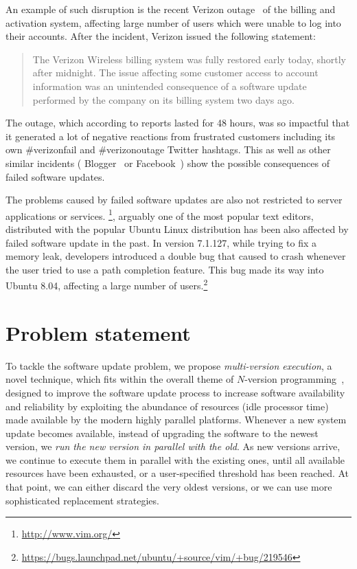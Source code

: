 An example of such disruption is the recent Verizon
outage~\cite{verizon-outage2014} of the billing and activation system,
affecting large number of users which were unable to log into their accounts.
After the incident, Verizon issued the following statement:
\begin{quotation}
The Verizon Wireless billing system was fully restored early today, shortly
after midnight. The issue affecting some customer access to account information
was an unintended consequence of a software update performed by the company on
its billing system two days ago.
\end{quotation}
The outage, which according to reports lasted for 48 hours, was so impactful
that it generated a lot of negative reactions from frustrated customers
including its own \textsf{\#verizonfail} and \textsf{\#verizonoutage} Twitter
hashtags.  This as well as other similar incidents (\eg
Blogger~\cite{blogger-incident2011} or Facebook~\cite{facebook-incident2010})
show the possible consequences of failed software updates.

The problems caused by failed software updates are also not restricted to
server applications or services. \vim\footnote{\url{http://www.vim.org/}},
arguably one of the most popular text editors, distributed with the popular
Ubuntu Linux distribution has been also affected by failed software update in
the past.  In version 7.1.127, while trying to fix a memory leak, \vim
developers introduced a double  bug that caused \vim to crash
whenever the user tried to use a path completion feature.  This bug made its
way into Ubuntu 8.04, affecting a large number of
users.\footnote{\url{https://bugs.launchpad.net/ubuntu/+source/vim/+bug/219546}}

\section{Problem statement}

To tackle the software update problem, we propose \emph{multi-version
execution}, a novel technique, which fits within the overall theme of
$N$-version programming~\cite{avizienis:nvp,chen1995}, designed to improve the
software update process to increase software availability and reliability by
exploiting the abundance of resources (\eg idle processor time) made available
by the modern highly parallel platforms.  Whenever a new system update becomes
available, instead of upgrading the software to the newest version, we
\emph{run the new version in parallel with the old}. As new versions arrive, we
continue to execute them in parallel with the existing ones, until all
available resources have been exhausted, or a user-specified threshold has been
reached.  At that point, we can either discard the very oldest versions, or we
can use more sophisticated replacement strategies.


